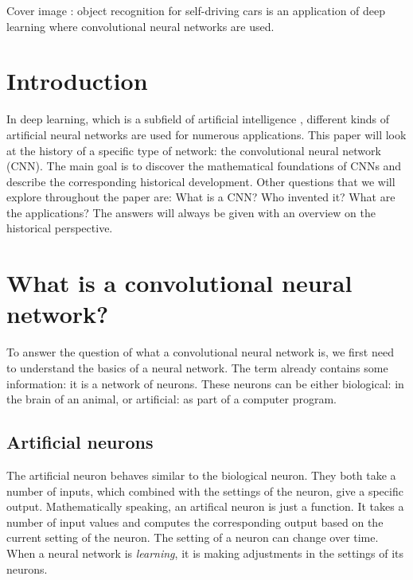 \documentclass{article}
\begin{document}



\newpage
Cover image \cite{effps}: object recognition for self-driving cars is an application of deep learning where convolutional neural networks are used.


\vspace{1cm}

\tableofcontents

\vspace{1cm}


\section{Introduction}

In deep learning, which is a subfield of artificial intelligence \cite[Ch. 1]{dl-book}, %
different kinds of artificial neural networks are used for numerous applications. This paper will look at the history of a specific type of network: the convolutional neural network (CNN). The main goal is to discover the mathematical foundations of CNNs and describe the corresponding historical development. Other questions that we will explore throughout the paper are: What is a CNN? Who invented it? What are the applications? The answers will always be given with an overview on the historical perspective.



\section{What is a convolutional neural network?}

To answer the question of what a convolutional neural network is, we first need to understand the basics of a neural network. The term already contains some information: it is a network of neurons. These neurons can be either biological: in the brain of an animal, or artificial: as part of a computer program.\\

\subsection{Artificial neurons}

The artificial neuron behaves similar to the biological neuron. They both take a number of inputs, which combined with the settings of the neuron, give a specific output. Mathematically speaking, an artifical neuron is just a function. It takes a number of input values and computes the corresponding output based on the current setting of the neuron. The setting of a neuron can change over time. When a neural network is \textit{learning}, it is making adjustments in the settings of its neurons.\\
\end{document}
